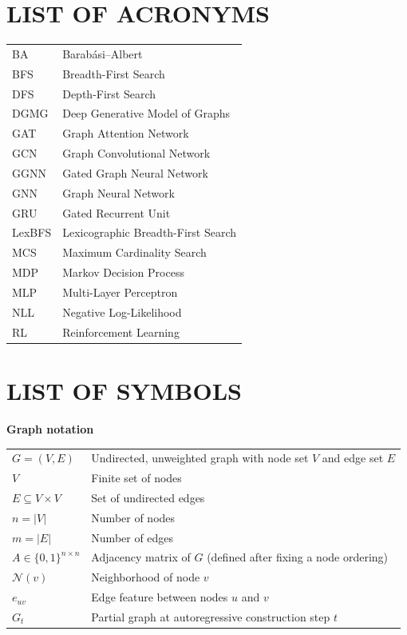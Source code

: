 \documentclass[12pt,a4paper,oneside]{report}
\begin{document}
\clearpage
\tableofcontents
\clearpage
\listoffigures
\clearpage
\listoftables
\clearpage

\chapter*{LIST OF ACRONYMS}
\begin{longtable}{p{3cm}p{11cm}}
BA   & Barab\'asi--Albert \\
BFS  & Breadth-First Search \\
DFS  & Depth-First Search \\
DGMG & Deep Generative Model of Graphs \\
GAT  & Graph Attention Network \\
GCN  & Graph Convolutional Network \\
GGNN & Gated Graph Neural Network \\
GNN  & Graph Neural Network \\
GRU  & Gated Recurrent Unit \\
LexBFS & Lexicographic Breadth-First Search \\
MCS  & Maximum Cardinality Search \\
MDP  & Markov Decision Process \\
MLP  & Multi-Layer Perceptron \\
NLL  & Negative Log-Likelihood \\
RL   & Reinforcement Learning \\
\end{longtable}

\clearpage

\chapter*{LIST OF SYMBOLS}

\noindent\textbf{Graph notation}
\begin{longtable}{p{3.8cm}p{10.2cm}}
$G=(V,E)$              & Undirected, unweighted graph with node set $V$ and edge set $E$ \\
$V$                    & Finite set of nodes \\
$E \subseteq V\times V$& Set of undirected edges \\
$n=|V|$                & Number of nodes \\
$m=|E|$                & Number of edges \\
$A\in\{0,1\}^{n\times n}$ & Adjacency matrix of $G$ (defined after fixing a node ordering) \\
$\mathcal{N}(v)$       & Neighborhood of node $v$ \\
$e_{uv}$               & Edge feature between nodes $u$ and $v$ \\
$G_t$                  & Partial graph at autoregressive construction step $t$ \\
\end{longtable}
\end{document}
